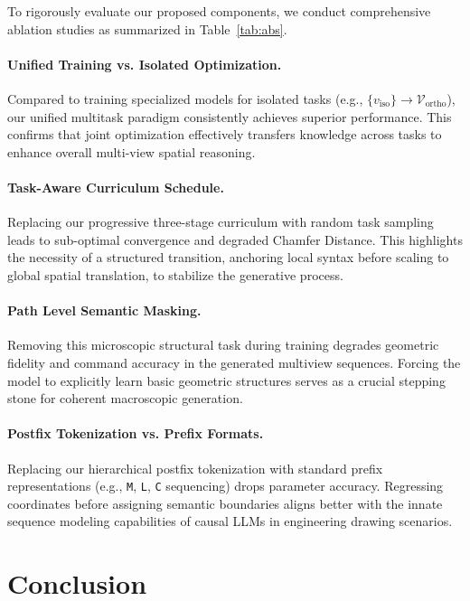\documentclass{article}
\begin{document}
To rigorously evaluate our proposed components, we conduct comprehensive ablation studies as summarized in Table~\ref{tab:abs}.

\paragraph{Unified Training vs. Isolated Optimization.}
Compared to training specialized models for isolated tasks (e.g., $\{v_{\text{iso}}\} \rightarrow \mathcal{V}_{\text{ortho}}$), our unified multitask paradigm consistently achieves superior performance. This confirms that joint optimization effectively transfers knowledge across tasks to enhance overall multi-view spatial reasoning.
\paragraph{Task-Aware Curriculum Schedule.}
Replacing our progressive three-stage curriculum with random task sampling leads to sub-optimal convergence and degraded Chamfer Distance. This highlights the necessity of a structured transition, anchoring local syntax before scaling to global spatial translation, to stabilize the generative process.

\paragraph{Path Level Semantic Masking.}
Removing this microscopic structural task during training degrades geometric fidelity and command accuracy in the generated multiview sequences. Forcing the model to explicitly learn basic geometric structures serves as a crucial stepping stone for coherent macroscopic generation.

\paragraph{Postfix Tokenization vs. Prefix Formats.}
Replacing our hierarchical postfix tokenization with standard prefix representations (e.g., \texttt{M}, \texttt{L}, \texttt{C} sequencing)  drops parameter accuracy. Regressing coordinates before assigning semantic boundaries aligns better with the innate sequence modeling capabilities of causal LLMs in engineering drawing scenarios.

\section{Conclusion}
\end{document}
